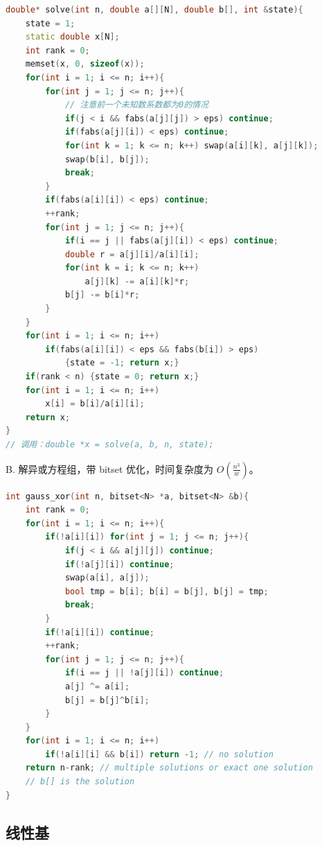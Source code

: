 \begin{lstlisting}[language = C++]
double* solve(int n, double a[][N], double b[], int &state){
    state = 1;
    static double x[N];
    int rank = 0;
    memset(x, 0, sizeof(x));
    for(int i = 1; i <= n; i++){
        for(int j = 1; j <= n; j++){
            // 注意前一个未知数系数都为0的情况
            if(j < i && fabs(a[j][j]) > eps) continue;
            if(fabs(a[j][i]) < eps) continue;
            for(int k = 1; k <= n; k++) swap(a[i][k], a[j][k]);
            swap(b[i], b[j]);
            break;
        }
        if(fabs(a[i][i]) < eps) continue;
        ++rank;
        for(int j = 1; j <= n; j++){
            if(i == j || fabs(a[j][i]) < eps) continue;
            double r = a[j][i]/a[i][i];
            for(int k = i; k <= n; k++)
                a[j][k] -= a[i][k]*r;
            b[j] -= b[i]*r;
        }
    }
    for(int i = 1; i <= n; i++)
        if(fabs(a[i][i]) < eps && fabs(b[i]) > eps)
            {state = -1; return x;}
    if(rank < n) {state = 0; return x;}
    for(int i = 1; i <= n; i++)
        x[i] = b[i]/a[i][i];
    return x;
}
// 调用：double *x = solve(a, b, n, state);
\end{lstlisting}

B. 解异或方程组，带 bitset 优化，时间复杂度为 $O(\frac{n^3}{w})$。

\begin{lstlisting}[language=C++]
int gauss_xor(int n, bitset<N> *a, bitset<N> &b){
    int rank = 0;
    for(int i = 1; i <= n; i++){
        if(!a[i][i]) for(int j = 1; j <= n; j++){
            if(j < i && a[j][j]) continue;
            if(!a[j][i]) continue;
            swap(a[i], a[j]);
            bool tmp = b[i]; b[i] = b[j], b[j] = tmp;
            break;
        }
        if(!a[i][i]) continue;
        ++rank;
        for(int j = 1; j <= n; j++){
            if(i == j || !a[j][i]) continue;
            a[j] ^= a[i];
            b[j] = b[j]^b[i];
        }
    }
    for(int i = 1; i <= n; i++)
        if(!a[i][i] && b[i]) return -1; // no solution
    return n-rank; // multiple solutions or exact one solution
    // b[] is the solution
}
\end{lstlisting}

\subsection{线性基}

